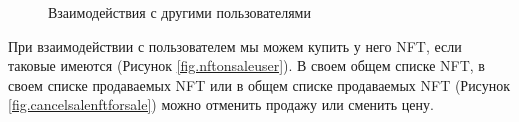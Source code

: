 \begin{figure}
    \centering
    \caption{Взаимодействия с другими пользователями}
\end{figure}

При взаимодействии с пользователем мы можем купить у него NFT, если таковые имеются (Рисунок {\color{blue} \ref{fig.nftonsaleuser}}). В своем общем списке NFT, в своем списке продаваемых NFT или в общем списке продаваемых NFT (Рисунок {\color{blue} \ref{fig.cancelsalenftforsale}}) можно отменить продажу или сменить цену.

